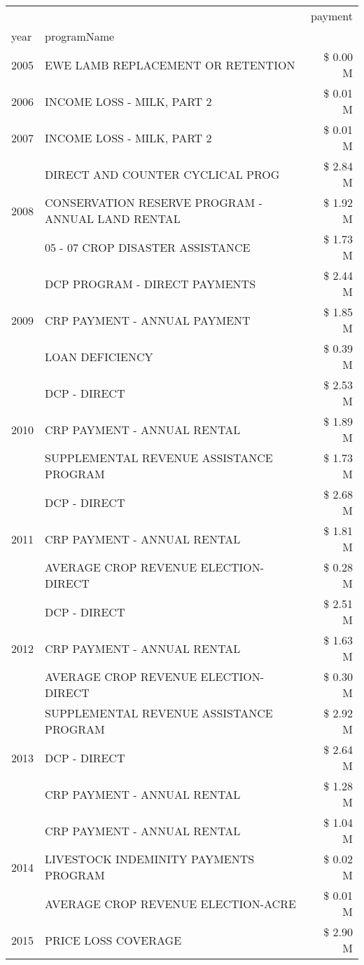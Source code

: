 \begin{tabular}{llr}
\toprule
 &  & payment \\
year & programName &  \\
\midrule
2005 & EWE LAMB REPLACEMENT OR RETENTION & \$ 0.00 M \\
\cline{1-3}
2006 & INCOME LOSS - MILK, PART 2 & \$ 0.01 M \\
\cline{1-3}
2007 & INCOME LOSS - MILK, PART 2 & \$ 0.01 M \\
\cline{1-3}
\multirow[t]{3}{*}{2008} & DIRECT AND COUNTER CYCLICAL PROG & \$ 2.84 M \\
 & CONSERVATION RESERVE PROGRAM - ANNUAL LAND RENTAL & \$ 1.92 M \\
 & 05 - 07 CROP DISASTER ASSISTANCE & \$ 1.73 M \\
\cline{1-3}
\multirow[t]{3}{*}{2009} & DCP PROGRAM - DIRECT PAYMENTS & \$ 2.44 M \\
 & CRP PAYMENT - ANNUAL PAYMENT & \$ 1.85 M \\
 & LOAN DEFICIENCY & \$ 0.39 M \\
\cline{1-3}
\multirow[t]{3}{*}{2010} & DCP - DIRECT & \$ 2.53 M \\
 & CRP PAYMENT - ANNUAL RENTAL & \$ 1.89 M \\
 & SUPPLEMENTAL REVENUE ASSISTANCE PROGRAM & \$ 1.73 M \\
\cline{1-3}
\multirow[t]{3}{*}{2011} & DCP - DIRECT & \$ 2.68 M \\
 & CRP PAYMENT - ANNUAL RENTAL & \$ 1.81 M \\
 & AVERAGE CROP REVENUE ELECTION-DIRECT & \$ 0.28 M \\
\cline{1-3}
\multirow[t]{3}{*}{2012} & DCP - DIRECT & \$ 2.51 M \\
 & CRP PAYMENT - ANNUAL RENTAL & \$ 1.63 M \\
 & AVERAGE CROP REVENUE ELECTION-DIRECT & \$ 0.30 M \\
\cline{1-3}
\multirow[t]{3}{*}{2013} & SUPPLEMENTAL REVENUE ASSISTANCE PROGRAM & \$ 2.92 M \\
 & DCP - DIRECT & \$ 2.64 M \\
 & CRP PAYMENT - ANNUAL RENTAL & \$ 1.28 M \\
\cline{1-3}
\multirow[t]{3}{*}{2014} & CRP PAYMENT - ANNUAL RENTAL & \$ 1.04 M \\
 & LIVESTOCK INDEMINITY PAYMENTS PROGRAM & \$ 0.02 M \\
 & AVERAGE CROP REVENUE ELECTION-ACRE & \$ 0.01 M \\
\cline{1-3}
\multirow[t]{3}{*}{2015} & PRICE LOSS COVERAGE & \$ 2.90 M \\

\end{tabular}
